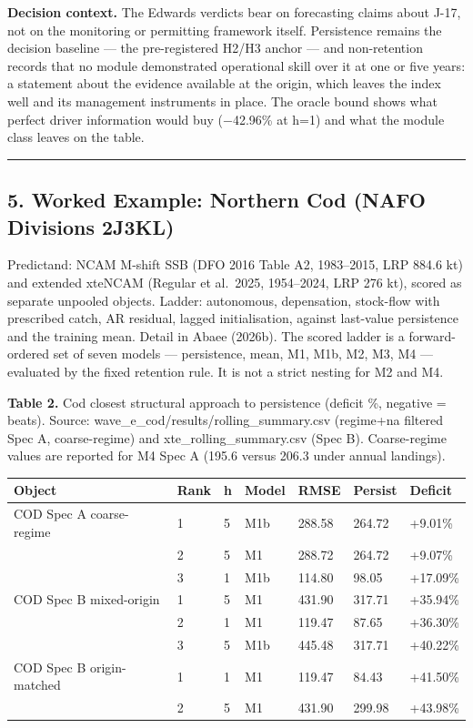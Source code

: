 \documentclass[11pt]{article}
\begin{document}
\textbf{Decision context.} The Edwards verdicts bear on forecasting
claims about J-17, not on the monitoring or permitting framework itself.
Persistence remains the decision baseline --- the pre-registered H2/H3
anchor --- and non-retention records that no module demonstrated
operational skill over it at one or five years: a statement about the
evidence available at the origin, which leaves the index well and its
management instruments in place. The oracle bound shows what perfect
driver information would buy (−42.96\% at h=1) and what the module class
leaves on the table.

\begin{center}\rule{0.5\linewidth}{0.5pt}\end{center}

\subsection{5. Worked Example: Northern Cod (NAFO Divisions
2J3KL)}\label{worked-example-northern-cod-nafo-divisions-2j3kl}

Predictand: NCAM M-shift SSB (DFO 2016 Table A2, 1983--2015, LRP 884.6
kt) and extended xteNCAM (Regular et al.~2025, 1954--2024, LRP 276 kt),
scored as separate unpooled objects. Ladder: autonomous, depensation,
stock-flow with prescribed catch, AR residual, lagged initialisation,
against last-value persistence and the training mean. Detail in Abaee
(2026b). The scored ladder is a forward-ordered set of seven models ---
persistence, mean, M1, M1b, M2, M3, M4 --- evaluated by the fixed
retention rule. It is not a strict nesting for M2 and M4.

\textbf{Table 2.} Cod closest structural approach to persistence
(deficit \%, negative = beats). Source:
wave\_e\_cod/results/rolling\_summary.csv (regime+na filtered Spec A,
coarse-regime) and xte\_rolling\_summary.csv (Spec B). Coarse-regime
values are reported for M4 Spec A (195.6 versus 206.3 under annual
landings).

{\def\LTcaptype{none} %
\begin{longtable}[]{@{}lllllll@{}}
\toprule\noalign{}
Object & Rank & h & Model & RMSE & Persist & Deficit \\
\midrule\noalign{}
\endhead
\bottomrule\noalign{}
\endlastfoot
COD Spec A coarse-regime & 1 & 5 & M1b & 288.58 & 264.72 & +9.01\% \\
& 2 & 5 & M1 & 288.72 & 264.72 & +9.07\% \\
& 3 & 1 & M1b & 114.80 & 98.05 & +17.09\% \\
COD Spec B mixed-origin & 1 & 5 & M1 & 431.90 & 317.71 & +35.94\% \\
& 2 & 1 & M1 & 119.47 & 87.65 & +36.30\% \\
& 3 & 5 & M1b & 445.48 & 317.71 & +40.22\% \\
COD Spec B origin-matched & 1 & 1 & M1 & 119.47 & 84.43 & +41.50\% \\
& 2 & 5 & M1 & 431.90 & 299.98 & +43.98\% \\
\end{longtable}
}
\end{document}
